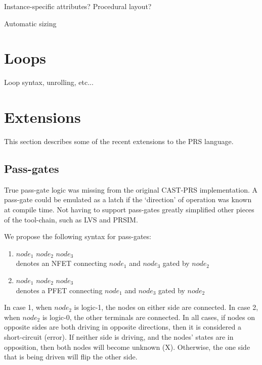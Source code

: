 Instance-specific attributes?
Procedural layout?

Automatic sizing

\section{Loops}
\label{sec:prs:loops}

Loop syntax, unrolling, etc...

\section{Extensions}
\label{sec:prs:ext}

This section describes some of the recent extensions to the PRS language.  

\subsection{Pass-gates}
\label{sec:prs:ext:passgates}

True pass-gate logic was missing from the original CAST-PRS implementation.  
A pass-gate could be emulated as a latch if the `direction' of operation was
known at compile time.  
Not having to support pass-gates greatly simplified other pieces of the 
tool-chain, such as LVS and PRSIM.  

We propose the following syntax for pass-gates:

\begin{enumerate}
\item $node_1$ \ttt{<-} $node_2$ \ttt{->} $node_3$\\
	denotes an NFET connecting $node_1$ and $node_3$ gated by $node_2$
\item $node_1$ \ttt{<+} $node_2$ \ttt{+>} $node_3$\\
	denotes a PFET connecting $node_1$ and $node_3$ gated by $node_2$
\end{enumerate}

In case 1, when $node_2$ is logic-1, the nodes on either side are connected.
In case 2, when $node_2$ is logic-0, the other terminals are connected.  
In all cases, 
if nodes on opposite sides are both driving in opposite directions, 
then it is considered a short-circuit (error).  
If neither side is driving, and the nodes' states are in opposition, 
then both nodes will become unknown (X). 
Otherwise, the one side that is being driven will flip the other side.  


